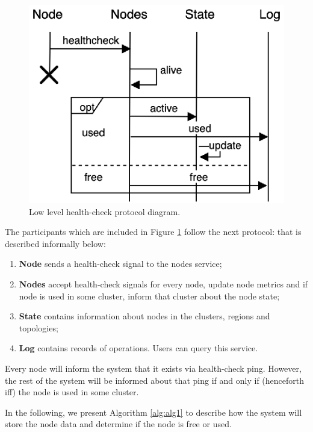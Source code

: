 \begin{figure}[H]
	\begin{center}
		\includegraphics[scale=0.75]{images/FIG2}
	\end{center}
	\vspace{-0.7cm}
	\caption{Low level health-check protocol diagram.}
	\label{fig:fig6}
\end{figure} 

The participants which are included in Figure \ref{fig:fig6} follow the next protocol:\label{informal_description_health-check} that is described informally below:

\begin{enumerate}[start=1,label={(\bfseries \arabic*)}]
\item \textbf{Node} sends a health-check signal to the nodes service;
\item \textbf{Nodes} accept health-check signals for every node, update node metrics and if node is used in some cluster, inform that cluster about the node state;
\item \textbf{State} contains information about nodes in the clusters, regions and topologies;
\item \textbf{Log} contains records of operations. Users can query this service. 
\end{enumerate}

Every node will inform the system that it exists via health-check ping. However, the rest of the system will be informed about that ping if and only if (henceforth iff) the node is used in some cluster. 

In the following, we present Algorithm \ref{alg:alg1} to describe how the system will store the node data and determine if the node is free or used.

